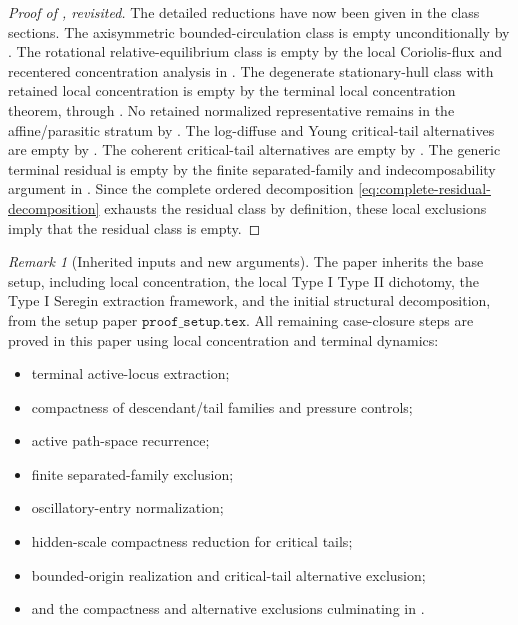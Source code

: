 \documentclass[11pt]{amsart}
\numberwithin{equation}{section}
\theoremstyle{plain}
\theoremstyle{definition}
\theoremstyle{remark}
\newtheorem{remark}[theorem]{Remark}
\begin{document}
\begin{proof}[Proof of , revisited]
The detailed reductions have now been given in the class sections.  The
axisymmetric bounded-circulation class is empty unconditionally by
.  The rotational relative-equilibrium class is empty
by the local Coriolis-flux and recentered concentration analysis in
.  The degenerate stationary-hull class with
retained local concentration is empty by the terminal local concentration theorem, through
.  No retained normalized representative remains in the
affine/parasitic stratum by .  The log-diffuse and Young
critical-tail alternatives are empty by
.
The coherent critical-tail alternatives are empty by
.  The generic terminal
residual is empty by the
finite separated-family and indecomposability argument in
.
Since the complete ordered decomposition \eqref{eq:complete-residual-decomposition} exhausts the
residual class by definition, these local exclusions imply that the residual
class is empty.
\end{proof}

\begin{remark}[Inherited inputs and new arguments]
\label{rem:imported-vs-proved}
The paper inherits the base setup, including local concentration, the local Type I
Type II dichotomy, the Type I Seregin extraction framework, and the initial
structural decomposition, from the setup paper
\(\texttt{proof\_setup.tex}\).  All remaining case-closure steps are proved in this
paper using local concentration and terminal dynamics:
\begin{itemize}
\item terminal active-locus extraction;
\item compactness of descendant/tail families and pressure controls;
\item active path-space recurrence;
\item finite separated-family exclusion;
\item oscillatory-entry normalization;
\item hidden-scale compactness reduction for critical tails;
\item bounded-origin realization and critical-tail alternative exclusion;
\item and the compactness and alternative exclusions culminating in
 .
\end{itemize}
\end{remark}
\end{document}
